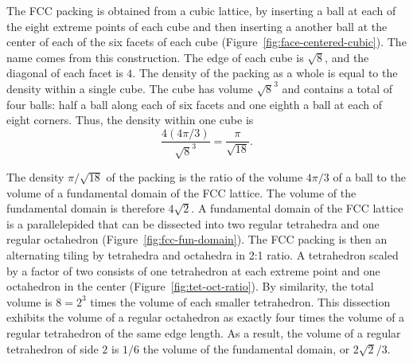 The FCC packing is obtained from a cubic lattice, by inserting a ball
at each of the eight extreme points of each cube and then inserting a
another ball at the center of each of the six facets of each cube
(Figure~\ref{fig:face-centered-cubic}).  The name
 comes from this construction.  The edge
of each cube is $\sqrt8$, and the diagonal of each facet is $4$.  The
density of the packing as a whole is equal to the density within a
single cube.  The cube has volume $\sqrt8^3$ and contains a total of
four balls: half a ball along each of six facets and one eighth a ball
at each of eight corners.  Thus, the density within one cube is
   \[ 
   \frac{   4 (4\pi/3)}{\sqrt8^3} = \frac{\pi}{\sqrt{18}}.
   \] 


\figTCFVGTS %



The density $\pi/\sqrt{18}$ of the packing is the ratio of the volume
$4\pi/3$ of a ball to the volume of a fundamental domain of the FCC
lattice.  The volume of the fundamental domain is therefore
$4\sqrt{2}$.  A fundamental domain of the FCC lattice is a
parallelepided that can be dissected into two regular tetrahedra and
one regular octahedron (Figure~\ref{fig:fcc-fun-domain}).  The FCC
packing is then an alternating tiling by tetrahedra and octahedra in
2:1 ratio.  A tetrahedron scaled by a factor of two consists of one
tetrahedron at each extreme point and one octahedron in the center
(Figure~\ref{fig:tet-oct-ratio}). By similarity, the total volume is
$8 = 2^3$ times the volume of each smaller tetrahedron. This
dissection exhibits the volume of a regular octahedron as exactly four
times the volume of a regular tetrahedron of the same edge length.  As
a result, the volume of a regular tetrahedron of side $2$ is $1/6$ the
volume of the fundamental domain, or $2\sqrt{2}/3$.

